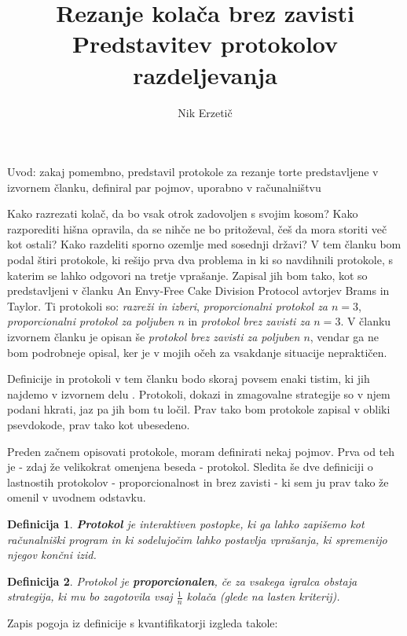 \documentclass[a4paper, 12pt]{article}
\title{
	\textbf{Rezanje kolača brez zavisti} \\
	\large Predstavitev protokolov razdeljevanja 
}
\author{Nik Erzetič}
\newtheorem{definicija}{Definicija}
\begin{document}
	
	\maketitle
	
	Uvod: zakaj pomembno, predstavil protokole za rezanje torte predstavljene v izvornem članku, definiral par pojmov, uporabno v računalništvu
	
	Kako razrezati kolač, da bo vsak otrok zadovoljen s svojim kosom? Kako razporediti hišna opravila, da se nihče ne bo pritoževal, češ da mora storiti več kot ostali? Kako razdeliti sporno ozemlje med sosednji državi? V tem članku bom podal štiri protokole, ki rešijo prva dva problema in ki so navdihnili protokole, s katerim se lahko odgovori na tretje vprašanje. Zapisal jih bom tako, kot so predstavljeni v članku An Envy-Free Cake Division Protocol \cite{brams-taylor} avtorjev Brams in Taylor. Ti protokoli so: \textit{razreži in izberi}, \textit{proporcionalni protokol za $n = 3$}, \textit{proporcionalni protokol za poljuben $n$} in \textit{protokol brez zavisti za $n = 3$}. V članku izvornem članku je opisan še \textit{protokol brez zavisti za poljuben $n$}, vendar ga ne bom podrobneje opisal, ker je v mojih očeh za vsakdanje situacije nepraktičen.
	
	Definicije in protokoli v tem članku bodo skoraj povsem enaki tistim, ki jih najdemo v izvornem delu \cite{brams-taylor}. Protokoli, dokazi in zmagovalne strategije so v njem podani hkrati, jaz pa jih bom tu ločil. Prav tako bom protokole zapisal v obliki psevdokode, prav tako kot ubesedeno.
	
	Preden začnem opisovati protokole, moram definirati nekaj pojmov. Prva od teh je - zdaj že velikokrat omenjena beseda - protokol. Sledita še dve definiciji o lastnostih protokolov - proporcionalnost in brez zavisti - ki sem ju prav tako že omenil v uvodnem odstavku.

	\begin{definicija}
		\textbf{Protokol} je interaktiven postopke, ki ga lahko zapišemo kot računalniški program in ki sodelujočim lahko postavlja vprašanja, ki spremenijo njegov končni izid.
	\end{definicija}

	\begin{definicija}
		Protokol je \textbf{proporcionalen}, če za vsakega igralca obstaja strategija, ki mu bo zagotovila vsaj $\frac{1}{n}$ kolača (glede na lasten kriterij).
	\end{definicija}

	Zapis pogoja iz definicije s kvantifikatorji izgleda takole:
	
\end{document}

